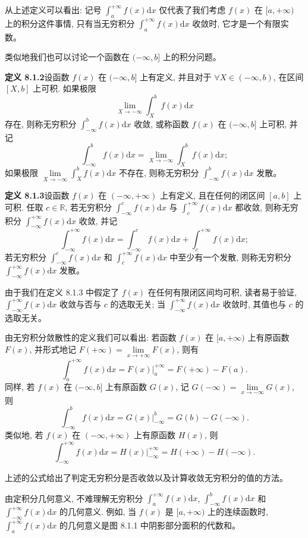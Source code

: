 \documentclass[UTF8,12pt,a4paper,fontset=fandol]{ctexart}
\begin{document}
从上述定义可以看出: 记号 $\int_a^{+\infty}f(x)\mathrm dx$ 仅代表了我们考虑 $f(x)$ 在 $[a,+\infty)$ 上的积分这件事情, 只有当无穷积分 $\int_a^{+\infty}f(x)\mathrm dx$ 收敛时, 它才是一个有限实数。

类似地我们也可以讨论一个函数在 $(-\infty,b]$ 上的积分问题。

\noindent\textbf{定义 8.1.2}\quad 设函数 $f(x)$ 在 $(-\infty,b]$ 上有定义, 并且对于 $\forall X\in(-\infty,b)$, 在区间 $[X,b]$ 上可积. 如果极限
\[
  \lim_{X\to-\infty}\int_X^b f(x)\mathrm dx
\]
存在, 则称无穷积分 $\int_{-\infty}^b f(x)\mathrm dx$ 收敛, 或称函数 $f(x)$ 在 $(-\infty,b]$ 上可积, 并记
\[
  \int_{-\infty}^b f(x)\mathrm dx=\lim_{X\to-\infty}\int_X^b f(x)\mathrm dx;
\]
如果极限 $\lim\limits_{X\to-\infty}\int_X^b f(x)\mathrm dx$ 不存在, 则称无穷积分 $\int_{-\infty}^b f(x)\mathrm dx$ 发散。

\noindent\textbf{定义 8.1.3}\quad 设函数 $f(x)$ 在 $(-\infty,+\infty)$ 上有定义, 且在任何的闭区间 $[a,b]$ 上可积. 任取 $c\in\mathbb R$, 若无穷积分 $\int_{-\infty}^c f(x)\mathrm dx$ 与 $\int_c^{+\infty}f(x)\mathrm dx$ 都收敛, 则称无穷积分 $\int_{-\infty}^{+\infty}f(x)\mathrm dx$ 收敛, 并记
\[
  \int_{-\infty}^{+\infty}f(x)\mathrm dx
  =
  \int_{-\infty}^c f(x)\mathrm dx
  +
  \int_c^{+\infty}f(x)\mathrm dx;
\]
若无穷积分 $\int_{-\infty}^c f(x)\mathrm dx$ 和 $\int_c^{+\infty}f(x)\mathrm dx$ 中至少有一个发散, 则称无穷积分 $\int_{-\infty}^{+\infty}f(x)\mathrm dx$ 发散。

由于我们在定义 8.1.3 中假定了 $f(x)$ 在任何有限闭区间均可积, 读者易于验证, $\int_{-\infty}^{+\infty}f(x)\mathrm dx$ 收敛与否与 $c$ 的选取无关; 当 $\int_{-\infty}^{+\infty}f(x)\mathrm dx$ 收敛时, 其值也与 $c$ 的选取无关。

由无穷积分敛散性的定义我们可以看出: 若函数 $f(x)$ 在 $[a,+\infty)$ 上有原函数 $F(x)$, 并形式地记 $F(+\infty)=\lim\limits_{x\to+\infty}F(x)$, 则有
\[
  \int_a^{+\infty}f(x)\mathrm dx=F(x)\big|_a^{+\infty}=F(+\infty)-F(a).
\]
同样, 若 $f(x)$ 在 $(-\infty,b]$ 上有原函数 $G(x)$, 记 $G(-\infty)=\lim\limits_{x\to-\infty}G(x)$, 则
\[
  \int_{-\infty}^b f(x)\mathrm dx=G(x)\big|_{-\infty}^b=G(b)-G(-\infty).
\]
类似地, 若 $f(x)$ 在 $(-\infty,+\infty)$ 上有原函数 $H(x)$, 则
\[
  \int_{-\infty}^{+\infty}f(x)\mathrm dx=H(x)\big|_{-\infty}^{+\infty}=H(+\infty)-H(-\infty).
\]

上述的公式给出了判定无穷积分是否收敛以及计算收敛无穷积分的值的方法。

由定积分几何意义, 不难理解无穷积分 $\int_a^{+\infty}f(x)\mathrm dx$, $\int_{-\infty}^b f(x)\mathrm dx$ 和 $\int_{-\infty}^{+\infty}f(x)\mathrm dx$ 的几何意义. 例如, 当 $f(x)$ 是 $[a,+\infty)$ 上的连续函数时, $\int_a^{+\infty}f(x)\mathrm dx$ 的几何意义是图 8.1.1 中阴影部分面积的代数和。
\end{document}
